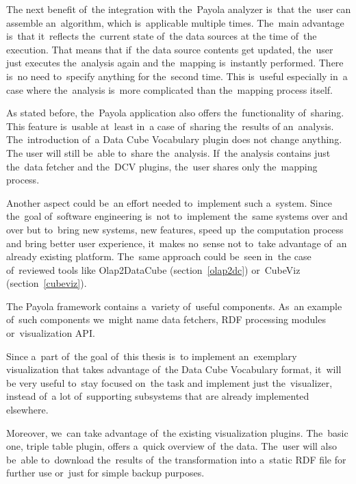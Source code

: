 The next benefit of~the integration with the~Payola analyzer is~that the~user 
can assemble an~algorithm, which is~applicable multiple times. The~main 
advantage is~that it~reflects the~current state of~the data sources at
the time of~the execution. That means that if~the data source contents get 
updated, the~user just executes the~analysis again and the~mapping is~instantly 
performed. There is~no need to~specify anything for the~second time.
This is~useful especially in~a case where the~analysis is~more complicated than the~mapping process itself.

As stated before, the~Payola application also offers the~functionality of~sharing. This feature is~usable at~least in~a case of~sharing the~results 
of an~analysis. The~introduction of~a Data Cube Vocabulary plugin does not change anything.
The user will still be~able to~share the~analysis. If~the analysis contains just the~data fetcher 
and the~DCV plugins, the~user shares only the~mapping process.

Another aspect could be~an effort needed to~implement such a~system. Since the~goal of~software engineering is~not to~implement the~same systems over and over 
but to~bring new systems, new features, speed up~the computation process and 
bring better user experience, it~makes no~sense not to~take advantage of~an already existing platform. The~same approach could be~seen in~the case of~reviewed 
tools like Olap2DataCube (section~\ref{olap2dc}) or~CubeViz 
(section~\ref{cubeviz}).

The Payola framework contains a~variety of~useful components. As~an example of~such components we~might name data fetchers, RDF processing modules or~visualization API.

Since a~part of~the goal of~this thesis is~to implement an~exemplary 
visualization that takes advantage of~the Data Cube Vocabulary format, it~will 
be very useful to~stay focused on~the task and implement just the~visualizer, 
instead of~a lot of~supporting subsystems that are already 
implemented elsewhere.

Moreover, we~can take advantage of~the existing visualization plugins. The~basic 
one, triple table plugin, offers a~quick overview of~the data. The~user 
will also be~able to~download the~results of~the transformation into a~static 
RDF file for further use or~just for simple backup purposes.

